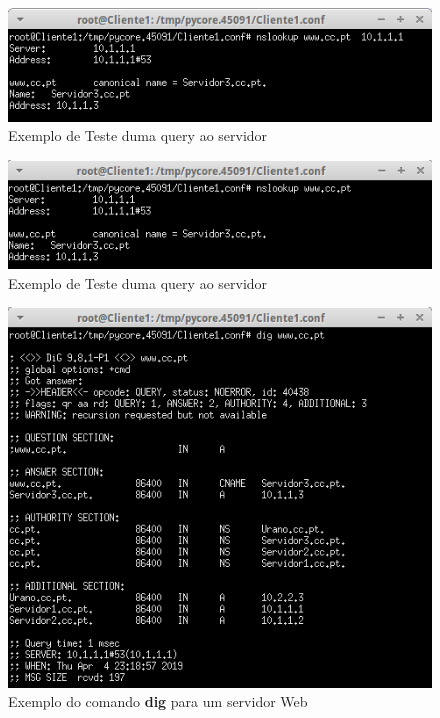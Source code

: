 \documentclass{llncs}
\begin{document}
\begin{figure}[H]
\begin{center}
\includegraphics[scale=0.75]{teste2.png}
\end{center}
\caption{\label{fig:t2}Exemplo de Teste duma query ao servidor}
\end{figure}

\begin{figure}[H]
\begin{center}
\includegraphics[scale=0.75]{teste3.png}
\end{center}
\caption{\label{fig:t3}Exemplo de Teste duma query ao servidor}
\end{figure}

\begin{figure}[H]
\begin{center}
\includegraphics[scale=0.75]{teste4.png}
\end{center}
\caption{\label{fig:t4}Exemplo do comando \textbf{dig} para um servidor Web }
\end{figure}
\end{document}
